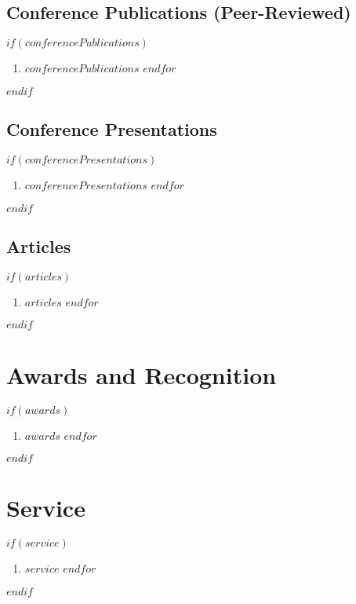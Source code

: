 \documentclass[$fontsize$, a4paper]{article}
\begin{document}
\subsection*{Conference Publications (Peer-Reviewed)}
$if(conferencePublications)$
\begin{enumerate}
$for(conferencePublications)$
\item $conferencePublications$
$endfor$
\end{enumerate}
$endif$

\subsection*{Conference Presentations}
$if(conferencePresentations)$
\begin{enumerate}
$for(conferencePresentations)$
\item $conferencePresentations$
$endfor$
\end{enumerate}
$endif$

\subsection*{Articles}
$if(articles)$
\begin{enumerate}
$for(articles)$
\item $articles$
$endfor$
\end{enumerate}
$endif$

\section*{Awards and Recognition}
$if(awards)$
\begin{enumerate}
$for(awards)$
\item $awards$
$endfor$
\end{enumerate}
$endif$

\section*{Service}
$if(service)$
\begin{enumerate}
$for(service)$
\item $service$
$endfor$
\end{enumerate}
$endif$
\end{document}

